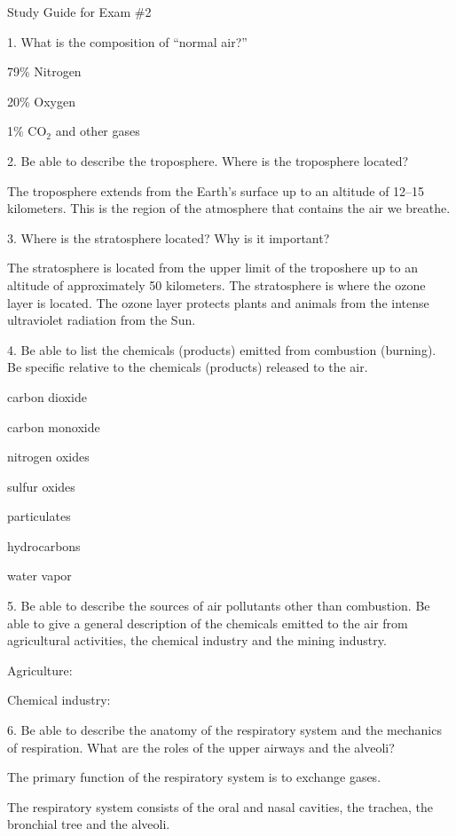 \beginsection Study Guide for Exam \#2


\bigskip
\item{1.} What is the composition of ``normal air?''
\item{} 79\% Nitrogen
\item{}20\% Oxygen
\item{}1\% CO${}_2$ and other gases

\bigskip
\item{2.} Be able to describe the troposphere.
Where is the troposphere located?

\item{} The troposphere extends from the Earth's surface
up to an altitude of 12--15 kilometers.
This is the region of the atmosphere that contains the air we breathe.

\bigskip
\item{3.} Where is the stratosphere located? Why is it important?
\item{} The stratosphere is located from the upper limit of
the troposhere up to an altitude of approximately 50 kilometers.
The stratosphere is where the ozone layer is located.
The ozone layer protects plants and animals from the
intense ultraviolet radiation from the Sun.

\bigskip
\item{4.} Be able to list the chemicals (products) emitted from
combustion (burning).
Be specific relative to the chemicals (products) released to the air.
\item{} carbon dioxide
\item{} carbon monoxide
\item{} nitrogen oxides
\item{} sulfur oxides
\item{} particulates
\item{} hydrocarbons
\item{} water vapor

\bigskip
\item{5.} Be able to describe the sources of air pollutants other
than combustion. Be able to give a general description of the chemicals
emitted to the air from agricultural activities, the chemical
industry and the mining industry.
\item{} Agriculture:
\item{} Chemical industry:

\bigskip
\item{6.} Be able to describe the anatomy of the respiratory system
and the mechanics of respiration.
What are the roles of the upper airways and the alveoli?
\item{} The primary function of the respiratory system is to exchange gases.
\item{} The respiratory system consists of the oral and nasal cavities,
the trachea, the bronchial tree and the alveoli.

